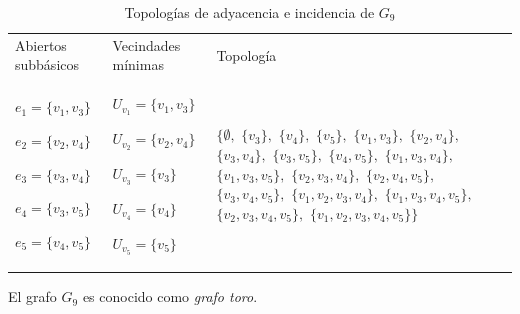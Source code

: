 \begin{table}[p]
\begin{tabular}{@{}>{\centering\arraybackslash}m{}>{\centering\arraybackslash}m{}>{\centering\arraybackslash}m{}@{}}
      \hline
      \multicolumn{3}{c}{\textbf{Topología de incidencia}} \\
      \hline
      Abiertos subbásicos & Vecindades mínimas & Topología \\
      \hline
         ${e_{1}=\{v_1,v_3\}}$\par
         ${e_{2}=\{v_2,v_4\}}$\par
         ${e_{3}=\{v_3,v_4\}}$\par
         ${e_{4}=\{v_3,v_5\}}$\par
         ${e_{5}=\{v_4,v_5\}}$
      &
         ${U_{v_1}=\{v_1,v_3\}}$\par
         ${U_{v_2}=\{v_2,v_4\}}$\par
         ${U_{v_3}=\{v_3\}}$\par
         ${U_{v_4}=\{v_4\}}$\par
         ${U_{v_5}=\{v_5\}}$
      &
         $\{\emptyset,$ $\{v_3\},$ $\{v_4\},$ $\{v_5\},$ $\{v_1,v_3\},$ $\{v_2,v_4\},$ $\{v_3,v_4\},$ $\{v_3,v_5\},$ $\{v_4,v_5\},$ $\{v_1,v_3,v_4\},$ $\{v_1,v_3,v_5\},$ $\{v_2,v_3,v_4\},$ $\{v_2,v_4,v_5\},$ $\{v_3,v_4,v_5\},$ $\{v_1,v_2,v_3,v_4\},$ $\{v_1,v_3,v_4,v_5\},$ $\{v_2,v_3,v_4,v_5\},$ $\{v_1,v_2,v_3,v_4,v_5\}\}$ \\[6pt]
      \hline
   \end{tabular}
   \caption{Topologías de adyacencia e incidencia de $G_9$}
   \label{tab:topologias_G_9}

   \vspace{2em}
   \begin{minipage}{\textwidth}
      \normalsize
      El grafo $G_9$ es conocido como \textit{grafo toro}.
   \end{minipage}
\end{table}

